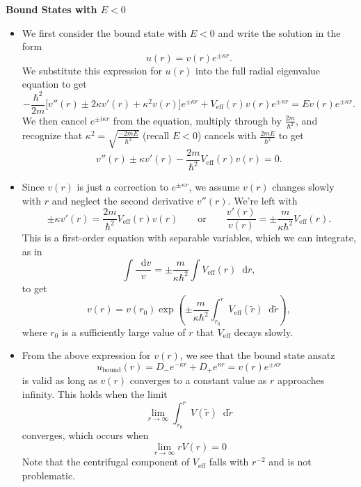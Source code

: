 \documentclass[11pt, a4paper]{article}
\newcommand{\diff}{\mathop{}\!\mathrm{d}} %
\newcommand{\eqtext}[1]{\qquad \text{#1} \qquad}
\renewcommand{\t}[1]{\tilde{#1}}
\begin{document}
\textbf{Bound States with $ E < 0 $}
\begin{itemize}
	\item We first consider the bound state with $ E < 0 $ and write the solution in the form
	\begin{equation*}
		u(r) = v(r) e^{\pm \kappa r}.
	\end{equation*}
	We substitute this expression for $ u(r) $ into the full radial eigenvalue equation to get
	\begin{equation*}
		-\frac{\hbar^{2}}{2m}\Big[v''(r) \pm 2\kappa v'(r) + \kappa^{2}v(r)\Big]e^{\pm \kappa r} + V_{\text{eff}}(r)v(r)e^{\pm \kappa r} = E v(r)e^{\pm \kappa r}.
	\end{equation*}
	We then cancel $ e^{\pm i \kappa r} $ from the equation, multiply through by $ \frac{2m}{\hbar^{2}} $, and recognize that $ \kappa^{2} = \sqrt{\frac{-2mE}{\hbar^{2}}} $ (recall $ E < 0 $) cancels with $ \frac{2mE}{\hbar^{2}} $ to get
	\begin{equation*}
		v''(r) \pm \kappa v'(r) - \frac{2m}{\hbar^{2}}V_{\text{eff}}(r)v(r) = 0.
	\end{equation*}
	
	\item Since $ v(r) $ is just a correction to $ e^{\pm \kappa r} $, we assume $ v(r) $ changes slowly with $ r $ and neglect the second derivative $ v''(r) $. We're left with
	\begin{equation*}
		\pm \kappa v'(r) = \frac{2m}{\hbar^{2}}V_{\text{eff}}(r)v(r) \eqtext{or} \frac{v'(r)}{v(r)} = \pm \frac{m}{\kappa \hbar^{2}}V_{\text{eff}}(r).
	\end{equation*}
	This is a first-order equation with separable variables, which we can integrate, as in
	\begin{equation*}
		\int \frac{\diff v}{v} = \pm \frac{m}{\kappa \hbar^{2}} \int V_{\text{eff}}(r) \diff r,
	\end{equation*}
	to get
	\begin{equation*}
		v(r) = v(r_{0}) \exp(\pm \frac{m}{\kappa \hbar^{2}}\int_{r_{0}}^{r}V_{\text{eff}}(\t{r})\diff \t{r}),
	\end{equation*}
	where $ r_{0} $ is a sufficiently large value of $ r $ that $ V_{\text{eff}} $ decays slowly.
	
	\item From the above expression for $ v(r) $, we see that the bound state ansatz
	\begin{equation*}
		u_{\text{bound}}(r) = D_{-}e^{-\kappa r} + D_{+}e^{\kappa r} = v(r)e^{\pm \kappa r}
	\end{equation*}
	is valid as long as $ v(r) $ converges to a constant value as $ r $ approaches infinity. This holds when the limit
	\begin{equation*}
		\lim_{r \to \infty} \int_{r_{0}}^{r}V(\t{r})\diff \t{r}
	\end{equation*}
	converges, which occurs when 
	\begin{equation*}
		\lim_{r \to \infty}rV(r) = 0
	\end{equation*}
	Note that the centrifugal component of $ V_{\text{eff}} $ falls with $ r^{-2} $ and is not problematic. 
	

\end{itemize}
\end{document}
